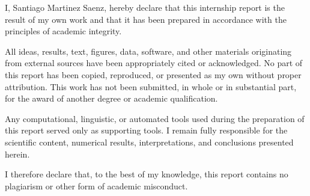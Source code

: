 \documentclass[11pt,a4paper]{article}
\begin{document}
\begin{sloppypar}
I, Santiago Martinez Saenz, hereby declare that this internship report is the result of my own work and that it has been prepared in accordance with the principles of academic integrity.

All ideas, results, text, figures, data, software, and other materials originating from external sources have been appropriately cited or acknowledged. No part of this report has been copied, reproduced, or presented as my own without proper attribution. This work has not been submitted, in whole or in substantial part, for the award of another degree or academic qualification.

Any computational, linguistic, or automated tools used during the preparation of this report served only as supporting tools. I remain fully responsible for the scientific content, numerical results, interpretations, and conclusions presented herein.

I therefore declare that, to the best of my knowledge, this report contains no plagiarism or other form of academic misconduct.

\end{sloppypar}
\end{document}
